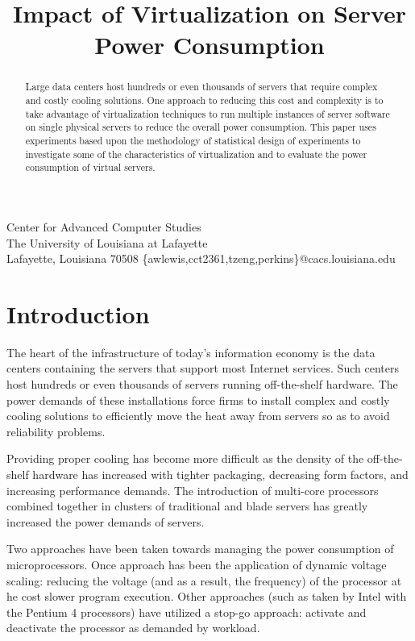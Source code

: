 \documentclass[preprint]{sigplanconf}
\begin{document}
\title{Impact of Virtualization on Server Power Consumption}
  {Center for Advanced Computer Studies\\
    The University of Louisiana at Lafayette\\
    Lafayette, Louisiana 70508}
   {\{awlewis,cct2361,tzeng,perkins\}@cacs.louisiana.edu }
\maketitle

\begin{abstract}
\label{abstract}
Large data centers host hundreds or even thousands of servers that require
complex and costly cooling solutions.  One approach to reducing this cost and
complexity is to take advantage of virtualization techniques to run multiple
instances of server software on single physical servers to reduce the overall
power consumption.  This paper uses experiments based upon the methodology of
statistical design of experiments to investigate some of the characteristics
of virtualization and to evaluate the power consumption of virtual servers.
\end{abstract}

\section{Introduction}
\label{sec:Introduction}
The heart of the infrastructure of today's information economy is the
data centers containing the servers that support most Internet services.
Such centers host hundreds or even thousands of servers running off-the-shelf
hardware.   The power demands of these installations force firms to install
complex and costly cooling solutions to efficiently move the heat away from
servers so as to avoid reliability problems.

Providing proper cooling has become more difficult as the density of the
off-the-shelf hardware has increased with tighter packaging, decreasing form
factors, and increasing performance demands.  The introduction of multi-core
processors combined together in clusters of traditional and blade servers has
greatly increased the power demands of servers.

Two approaches have been taken towards managing the power
consumption of microprocessors.   Once approach has been the application of
dynamic voltage scaling: reducing the voltage (and as a result, the frequency)
of the processor at he cost slower program execution.   Other approaches (such
as taken by Intel with the Pentium 4 processors) have utilized a stop-go
approach: activate and deactivate the processor as demanded by workload.
\end{document}
